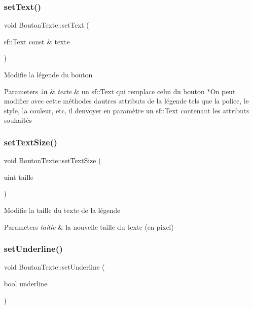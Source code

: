 \subsubsection{\texorpdfstring{set\+Text()}{setText()}\hspace{0.1cm}{\footnotesize\ttfamily [2/2]}}
{\footnotesize\ttfamily void Bouton\+Texte\+::set\+Text (\begin{DoxyParamCaption}\item[{sf\+::\+Text const \&}]{texte }\end{DoxyParamCaption})}

Modifie la légende du bouton 
\begin{DoxyParams}[1]{Parameters}
\mbox{\tt in}  & {\em texte} & un sf\+::\+Text qui remplace celui du bouton $\ast$\+On peut modifier avec cette méthodes d\textquotesingle{}autres attributs de la légende tels que la police, le style, la couleur, etc, il d\textquotesingle{}envoyer en paramètre un sf\+::\+Text contenant les attributs souhaités \\
\hline
\end{DoxyParams}
\mbox{\label{classBoutonTexte_a6f61089ff0ac3781d7e8ee6b71abbd01}} 
\subsubsection{\texorpdfstring{set\+Text\+Size()}{setTextSize()}}
{\footnotesize\ttfamily void Bouton\+Texte\+::set\+Text\+Size (\begin{DoxyParamCaption}\item[{uint}]{taille }\end{DoxyParamCaption})}

Modifie la taille du texte de la légende 
\begin{DoxyParams}{Parameters}
{\em taille} & la nouvelle taille du texte (en pixel) \\
\hline
\end{DoxyParams}
\mbox{\label{classBoutonTexte_a6b1db5ebeca2a12e5525770ed5636687}} 
\subsubsection{\texorpdfstring{set\+Underline()}{setUnderline()}}
{\footnotesize\ttfamily void Bouton\+Texte\+::set\+Underline (\begin{DoxyParamCaption}\item[{bool}]{underline }\end{DoxyParamCaption})}

